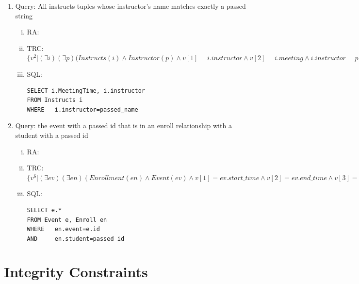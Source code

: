 \documentclass[pdftex,12pt,letter]{article}
\begin{document}
\begin{enumerate}[1.]
\begin{enumerate}[i.]
\item RA:
\item TRC: $\{v^2\vert(\exists i)(\exists m)(\exists en)(Instructs(i) \wedge MeetingTime(m) \wedge Enrollment(e) \wedge v[1]=i.instructor \wedge v[2]=i.meeting \wedge i.meeting=m.id \wedge en.student=input\_id \wedge en.event=m.id)\}$
\item SQL:
\begin{verbatim}
SELECT i.MeetingTime, i.instructor
FROM Instructs i, MeetingTime m
WHERE 	i.meeting=m.id
AND		i.student=passed\_id
\end{verbatim}
\end{enumerate}
\item Query: All instructs tuples whose instructor's name matches exactly a passed string
\begin{enumerate}[i.]
\item RA:
\item TRC: $\{v^2\vert(\exists i)(\exists p)(Instructs(i) \wedge Instructor(p) \wedge v[1]=i.instructor \wedge v[2]=i.meeting \wedge i.instructor=p.name \wedge p.name=input\_name\} $
\item SQL:
\begin{verbatim}
SELECT i.MeetingTime, i.instructor
FROM Instructs i
WHERE 	i.instructor=passed_name
\end{verbatim}
\end{enumerate}
\item Query: the event with a passed id that is in an enroll relationship with a
student with a passed id
\begin{enumerate}[i.]
\item RA:
\item TRC: $\{v^6 \vert (\exists ev)(\exists en)(Enrollment(en) \wedge Event(ev) \wedge v[1]=ev.start\_time \wedge v[2]=ev.end\_time \wedge v[3]=ev.start\_date \wedge v[4].ev.end\_date \wedge v[5]=ev.recur\_type \wedge v[6]=ev.id \wedge en.event = ev.id \wedge en.student=input\_case\_id \wedge ev.id=\wedge input\_event\_id)\}$
\item SQL:
\begin{verbatim}
SELECT e.*
FROM Event e, Enroll en
WHERE 	en.event=e.id
AND		en.student=passed_id
\end{verbatim}
\end{enumerate}
\end{enumerate}

\section{Integrity Constraints}
\end{document}
